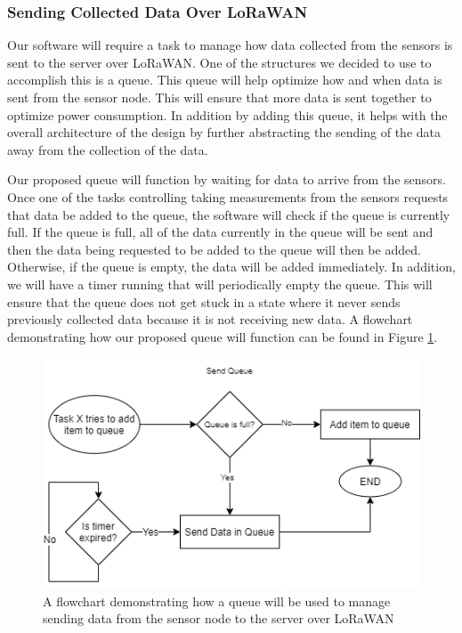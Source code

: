 \subsubsection{Sending Collected Data Over LoRaWAN}
Our software will require a task to manage how data collected from the sensors is sent to the server over LoRaWAN. One of the structures we decided to use to accomplish this is a queue. This queue will help optimize how and when data is sent from the sensor node. This will ensure that more data is sent together to optimize power consumption. In addition by adding this queue, it helps with the overall architecture of the design by further abstracting the sending of the data away from the collection of the data.

Our proposed queue will function by waiting for data to arrive from the sensors. Once one of the tasks controlling taking measurements from the sensors requests that data be added to the queue, the software will check if the queue is currently full. If the queue is full, all of the data currently in the queue will be sent and then the data being requested to be added to the queue will then be added. Otherwise, if the queue is empty, the data will be added immediately. In addition, we will have a timer running that will periodically empty the queue. This will ensure that the queue does not get stuck in a state where it never sends previously collected data because it is not receiving new data. A flowchart demonstrating how our proposed queue will function can be found in Figure \ref{fig:queue-diagram}.

\begin{figure}[H]
    \centering
    \includegraphics[width=6in]{figures/queue-diagram.png}
    \caption{A flowchart demonstrating how a queue will be used to manage sending data from the sensor node to the server over LoRaWAN}
    \label{fig:queue-diagram} 
\end{figure}

